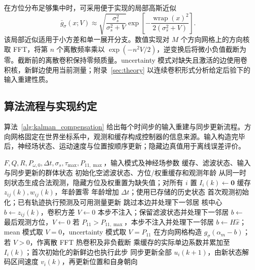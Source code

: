 \documentclass[UTF8,fontset=windows,11pt]{ctexart}
\begin{document}
在方位分布足够集中时，可采用便于实现的局部高斯近似
\begin{equation}
 \bar g_\sigma(x;V)\approx
 \sqrt{\frac{\sigma_s^2}{\sigma_s^2+V}}
 \exp\left[-\frac{\operatorname{wrap}(x)^2}{2(\sigma_s^2+V)}\right].
\end{equation}
该局部近似适用于小方差和单一展开分支。数值实现对 $M$ 个方向网格上的方向核取 FFT，将第 $n$ 个离散频率乘以 $\exp(-n^2V/2)$，逆变换后将微小负值截断为零。截断前的离散卷积保持零频质量。uncertainty 模式对缺失且激活的边使用卷积核，新鲜边使用当前测量；附录~\ref{sec:theory} 以连续卷积形式分析给定后验下的输入重建性质。

\subsection{算法流程与实现约定}

算法~\ref{alg:kalman_compensation} 给出每个时间步的输入重建与同步更新流程。方向网格固定在世界坐标系中，观测和缓存构成控制器的信息来源。输入构造完毕后，神经场状态、运动速度与位置按顺序更新；隐藏边真值用于离线误差评价。

\begin{algorithm}[!tbp]
\caption{新鲜观测直通与缺失边预测输入}
\label{alg:kalman_compensation}
\small
\begin{algorithmic}[1]
\Require $F,Q,R,P_{\omega,0},\Delta t,\sigma_s,\tau_{\max},P_{11,\max}$，输入模式及神经场参数
\Ensure 缓存、滤波状态、输入与同步更新的群体状态
\State 初始化空滤波状态、方位/权重缓存和观测年龄
 \State 从同一时刻状态生成合法观测，隐藏方位及权重置为缺失值；对所有 $i$ 置 $I_i(k)\leftarrow\mathbf 0$
   \State 缓存 $z_{ij}(k),w_{ij}(k)$，年龄置零
  \Else
   \State 年龄增加 $\Delta t$；使用已存储的历史状态
  \EndIf
  \State 首次观测初始化；已有轨迹执行预测及可用测量更新
   \State 跳过本边并处理下一邻居
  \EndIf
   \State 核中心 $b\leftarrow z_{ij}(k)$，卷积方差 $V\leftarrow0$
   \State 本步不注入；保留滤波状态并处理下一邻居
   \State $b\leftarrow$ 最后观测方位，$V\leftarrow0$
  \Else
   \State 若 $P_{11}>P_{11,\max}$，本步不注入并处理下一邻居
   \State $b\leftarrow H\hat x$；mean 模式取 $V=0$，uncertainty 模式取 $V=P_{11}$
  \EndIf
  \State 在方向网格构造 $g_\sigma(\alpha_m-b)$；若 $V>0$，作离散 FFT 热卷积及非负截断
  \State 乘缓存的实际单边系数并累加至 $I_i(k)$；首次初始化的新鲜边也执行此步
 \EndFor
 \State 同步更新全部 $u_i(k+1)$，由新状态解码区间速度 $v_i(k)$，再更新位置和自身朝向
\EndFor
\end{algorithmic}
\end{algorithm}
\end{document}
